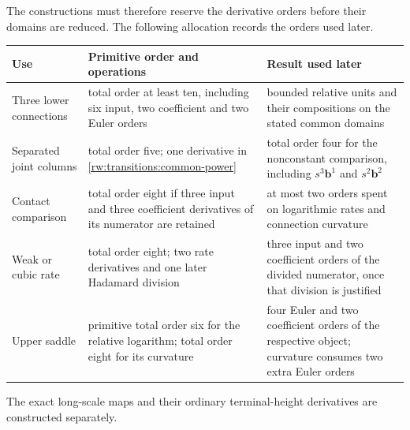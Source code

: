 The constructions must therefore reserve the derivative orders before
their domains are reduced.  The following allocation records the
orders used later.
\begin{center}\small
\begin{tabularx}{\linewidth}{@{}lXX@{}}
\toprule
Use & Primitive order and operations & Result used later\\
\midrule
Three lower connections & total order at least ten, including
six input, two coefficient and two Euler orders & bounded relative
units and their compositions on the stated common domains\\
Separated joint columns & total order five; one derivative in
\eqref{rw:transitions:common-power} & total order four for the
nonconstant comparison, including $s^3\mathbf b^1$ and $s^2\mathbf b^2$\\
Contact comparison & total order eight if three input and three
coefficient derivatives of its numerator are retained & at most two
orders spent on logarithmic rates and connection curvature\\
Weak or cubic rate & total order eight; two rate derivatives and
one later Hadamard division & three input and two coefficient orders
of the divided numerator, once that division is justified\\
Upper saddle & primitive total order six for the relative logarithm;
total order eight for its curvature & four Euler and two coefficient
orders of the respective object; curvature consumes two extra Euler
orders\\
\bottomrule
\end{tabularx}
\end{center}
The exact long-scale maps and their ordinary terminal-height derivatives
are constructed separately.

